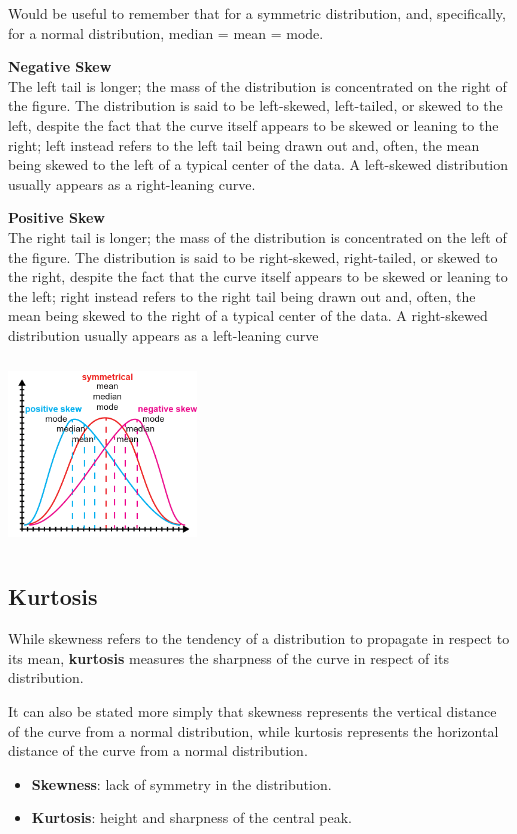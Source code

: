 \documentclass{article}
\begin{document}
Would be useful to remember that for a symmetric distribution, and, specifically, for a normal distribution, median = mean = mode.

\textbf{Negative Skew} \\
The left tail is longer; the mass of the distribution is concentrated on the right of the figure. The distribution is said to be left-skewed, left-tailed, or skewed to the left, despite the fact that the curve itself appears to be skewed or leaning to the right; left instead refers to the left tail being drawn out and, often, the mean being skewed to the left of a typical center of the data. A left-skewed distribution usually appears as a right-leaning curve.

\textbf{Positive Skew} \\
The right tail is longer; the mass of the distribution is concentrated on the left of the figure. The distribution is said to be right-skewed, right-tailed, or skewed to the right, despite the fact that the curve itself appears to be skewed or leaning to the left; right instead refers to the right tail being drawn out and, often, the mean being skewed to the right of a typical center of the data. A right-skewed distribution usually appears as a left-leaning curve

\includegraphics[width=5cm, height=5cm]{skew}

\subsection{Kurtosis}
While skewness refers to the tendency of a distribution to propagate in respect to its mean, \textbf{kurtosis} measures the sharpness of the curve in respect of its distribution. 

It can also be stated more simply that skewness represents the vertical distance of the curve from a normal distribution, while kurtosis represents the horizontal distance of the curve from a normal distribution.    

\begin{itemize}
    \item \textbf{Skewness}: lack of symmetry in the distribution.
    \item \textbf{Kurtosis}: height and sharpness of the central peak.
\end{itemize}
\end{document}
